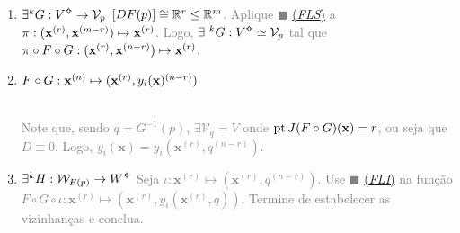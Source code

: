 \begin{enumerate}[left = 0.1cm]

\item[] \begin{tcolorbox}[colframe=gray, colback=white, boxrule = 0.8pt] 
\centering \textcolor{black}{\(\exists ^k G: V\ab \to \mathcal{V}_p\)}
\tcblower
\textcolor{gray}{\([DF(p)]\cong \mathbb{R}^r\leq \mathbb{R}^m\). Aplique \(\blacksquare\) \hyperlink{thmFLS}{(\emph{FLS})} a \(\pi:(\textbf{x}^{(r)},\textbf{x}^{(m-r)}) \mapsto \textbf{x}^{(r)}\). Logo, \(\exists \ ^k G: V\ab\simeq \mathcal{V}_p\) tal que \(\pi\circ F\circ G:(\textbf{x}^{(r)}, \textbf{x}^{(n-r)}) \mapsto \textbf{x}^{(r)}\).}
\end{tcolorbox}

\item[] \begin{tcolorbox}[colframe=gray, colback=white, boxrule = 0.8pt] 
  \centering \(F\circ G: \textbf{x}^{(n)}\mapsto (\textbf{x}^{(r)}, y_i(\textbf{x})^{(n-r)}) \)
  \tcblower 
\parbox[a]{0.83\linewidth}{\textcolor{gray}{\vspace{0.1cm}\\ Note que, sendo \(q = G^{-1}(p)\), \(\exists \mathcal{V}_q= V\) onde \(\operatorname{pt} J(F\circ G)(\textbf{x})=r\), ou seja que \(D\equiv 0\). Logo, \(y_i(\textbf{x}) = y_i(\textbf{x}^{(r)}, q^{(n-r)})\). 
}\vspace{0.2cm}}
\parbox[b]{0.17\linewidth}{  }
\end{tcolorbox}


\vspace{-0.8cm}

\item[]\begin{tcolorbox}[colframe=gray, colback=white, boxrule = 0.8pt] 
  \centering \(\exists ^k H : \mathcal{W}_{F(p)} \to W\ab\)
  \tcblower
  \textcolor{gray}{
  Seja \(\iota: \textbf{x}^{(r)} \mapsto (\textbf{x}^{(r)}, q^{(n-r)})\). Use \(\blacksquare\) \hyperlink{thmFLI}{(\emph{FLI})} na função 
  \(F\circ G\circ \iota : \textbf{x}^{(r)} \mapsto (\textbf{x}^{(r)}, y_i(\textbf{x}^{(r)},q))\). Termine de estabelecer as vizinhanças e conclua. }
\end{tcolorbox}
\end{enumerate}

